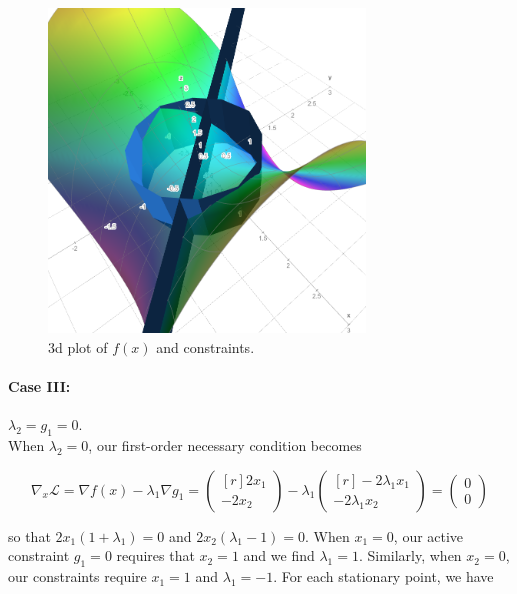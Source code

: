 \begin{solution}
    \begin{figure}[h]
        \centering
        \includegraphics*[width=0.75\textwidth]{problem_4b.png}
        \caption{3d plot of $f(x)$ and constraints.}
        \label{fig:problem_4b}
    \end{figure}

    \pagebreak
    \paragraph{Case III:} $\lambda_2 = g_1 = 0.$ \ \\
    When $\lambda_2 = 0$, our first-order necessary condition becomes

    $$
    \nabla_x \mathcal{L} = \nabla f(x) - \lambda_1 \nabla g_1 = \begin{pmatrix*}[r]
        2 x_1 \\
       -2 x_2
    \end{pmatrix*} - \lambda_1 \begin{pmatrix*}[r]
        -2 \lambda_1 x_1 \\
        -2 \lambda_1 x_2
    \end{pmatrix*} = \begin{pmatrix*}
        0 \\
        0
    \end{pmatrix*}
    $$

    so that $2 x_1 (1 + \lambda_1) = 0$ and $2 x_2 (\lambda_1 - 1) = 0$. When $x_1 = 0$, our active constraint $g_1 = 0$
    requires that $x_2 = 1$ and we find $\lambda_1 = 1$. Similarly, when $x_2 = 0$, our constraints require $x_1 = 1$ and
    $\lambda_1 = -1$. For each stationary point, we have


\end{solution}
